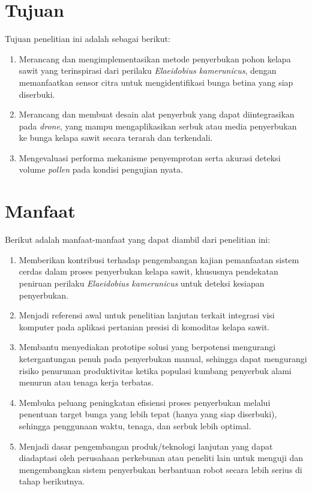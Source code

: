 \section{Tujuan}
\label{sec:tujuan}

Tujuan penelitian ini adalah sebagai berikut:
\begin{enumerate}
  \item Merancang dan mengimplementasikan metode penyerbukan pohon kelapa sawit yang terinspirasi dari perilaku \emph{Elaeidobius kamerunicus}, dengan memanfaatkan sensor citra untuk mengidentifikasi bunga betina yang siap diserbuki.
  \item Merancang dan membuat desain alat penyerbuk yang dapat diintegrasikan pada \emph{drone}, yang mampu mengaplikasikan serbuk atau media penyerbukan ke bunga kelapa sawit secara terarah dan terkendali.
  \item Mengevaluasi performa mekanisme penyemprotan serta akurasi deteksi volume \emph{pollen} pada kondisi pengujian nyata.
\end{enumerate}

\section{Manfaat}
\label{sec:manfaat}

Berikut adalah manfaat-manfaat yang dapat diambil dari penelitian ini:
\begin{enumerate}
  \item Memberikan kontribusi terhadap pengembangan kajian pemanfaatan sistem cerdas dalam proses penyerbukan kelapa sawit, khususnya pendekatan peniruan perilaku \emph{Elaeidobius kamerunicus} untuk deteksi kesiapan penyerbukan.
  \item Menjadi referensi awal untuk penelitian lanjutan terkait integrasi visi komputer pada aplikasi pertanian presisi di komoditas kelapa sawit.
  \item Membantu menyediakan prototipe solusi yang berpotensi mengurangi ketergantungan penuh pada penyerbukan manual, sehingga dapat mengurangi risiko penurunan produktivitas ketika populasi kumbang penyerbuk alami menurun atau tenaga kerja terbatas.
  \item Membuka peluang peningkatan efisiensi proses penyerbukan melalui penentuan target bunga yang lebih tepat (hanya yang siap diserbuki), sehingga penggunaan waktu, tenaga, dan serbuk lebih optimal.
  \item Menjadi dasar pengembangan produk/teknologi lanjutan yang dapat diadaptasi oleh perusahaan perkebunan atau peneliti lain untuk menguji dan mengembangkan sistem penyerbukan berbantuan robot secara lebih serius di tahap berikutnya.
\end{enumerate}

